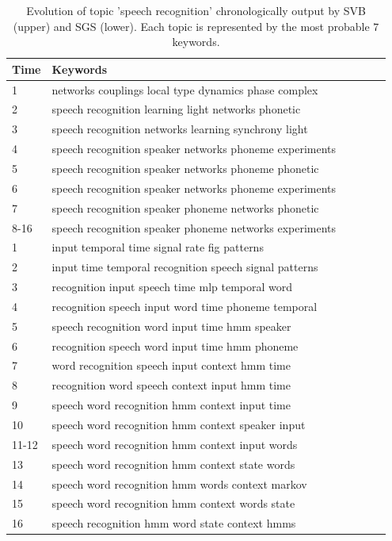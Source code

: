 \documentclass{article} %
\begin{document}
\begin{table}[t]
\caption{Evolution of topic 'speech recognition' chronologically output by SVB (upper) and SGS (lower). Each topic is represented by the most probable $7$ keywords.}
\label{tbl:evolution_of_topics}
\vskip 0.15in
\begin{center}
\begin{small}
\begin{tabular}{llllll}
\hline
{\sc Time} & {\sc Keywords} \\
\hline
1 & networks couplings local type dynamics phase complex \\
2 & speech recognition learning light networks phonetic  \\
3 & speech recognition networks learning synchrony light  \\
4 & speech recognition speaker networks phoneme experiments  \\
5 & speech recognition speaker networks phoneme phonetic  \\
6 & speech recognition speaker networks phoneme experiments  \\
7 & speech recognition speaker phoneme networks phonetic  \\
8-16 & speech recognition speaker phoneme networks experiments  \\

\hline
\hline
 1 & input temporal time signal rate fig patterns \\
 2 & input time temporal recognition speech signal patterns \\
 3 & recognition input speech time mlp temporal word \\
 4 & recognition speech input word time phoneme temporal \\
 5 & speech recognition word input time hmm speaker \\
 6 & recognition speech word input time hmm phoneme \\
 7 & word recognition speech input context hmm time \\
 8 & recognition word speech context input hmm time \\
 9 & speech word recognition hmm context input time \\
 10 & speech word recognition hmm context speaker input \\
 11-12 & speech word recognition hmm context input words \\
 13 & speech word recognition hmm context state words \\
 14 & speech word recognition hmm words context markov \\
 15 & speech word recognition hmm context words state \\
 16 & speech recognition hmm word state context hmms\\

\hline
\hline
\end{tabular}
\end{small}
\end{center}
\vskip -0.1in
\end{table}
\end{document}
